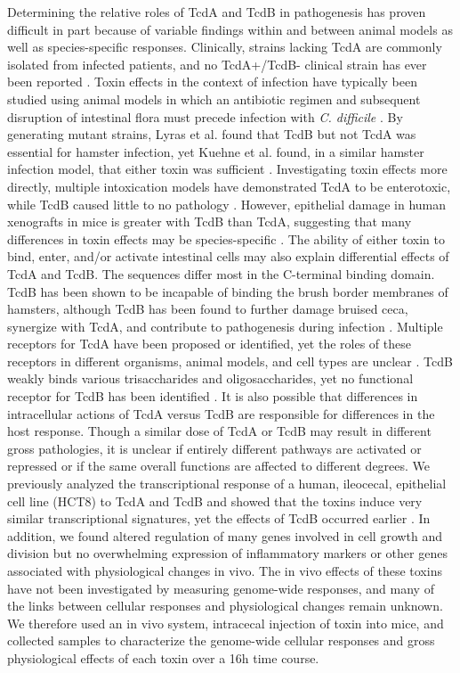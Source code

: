 Determining the relative roles of TcdA and TcdB in pathogenesis has proven difficult in part because of variable findings within and between animal models as well as species-specific responses. Clinically, strains lacking TcdA are commonly isolated from infected patients, and no TcdA+/TcdB- clinical strain has ever been reported \cite{Drudy:2007fa}. Toxin effects in the context of infection have typically been studied using animal models in which an antibiotic regimen and subsequent disruption of intestinal flora must precede infection with \textit{C. difficile} \cite{Small:1968ux,Bartlett:1977wr}. By generating mutant strains, Lyras et al. found that TcdB but not TcdA was essential for hamster infection, yet Kuehne et al. found, in a similar hamster infection model, that either toxin was sufficient \cite{Lyras:2009jx,Kuehne:2010hv}. Investigating toxin effects more directly, multiple intoxication models have demonstrated TcdA to be enterotoxic, while TcdB caused little to no pathology \cite{Libby:1982wm,Taylor:1981ud,Lyerly:1985dx}. However, epithelial damage in human xenografts in mice is greater with TcdB than TcdA, suggesting that many differences in toxin effects may be species-specific \cite{Savidge:2003ck}. The ability of either toxin to bind, enter, and/or activate intestinal cells may also explain differential effects of TcdA and TcdB. The sequences differ most in the C-terminal binding domain. TcdB has been shown to be incapable of binding the brush border membranes of hamsters, although TcdB has been found to further damage bruised ceca, synergize with TcdA, and contribute to pathogenesis during infection \cite{Lyras:2009jx,Lyerly:1985dx,Rolfe:1991vx}. Multiple receptors for TcdA have been proposed or identified, yet the roles of these receptors in different organisms, animal models, and cell types are unclear \cite{Krivan:1986tq,Tucker:1991uk,Rolfe:1995wl,Pothoulakis:1996ba,Pothoulakis:1996kd,Na:2008eu}. TcdB weakly binds various trisaccharides and oligosaccharides, yet no functional receptor for TcdB has been identified \cite{ElHawiet:2011ep}. It is also possible that differences in intracellular actions of TcdA versus TcdB are responsible for differences in the host response. Though a similar dose of TcdA or TcdB may result in different gross pathologies, it is unclear if entirely different pathways are activated or repressed or if the same overall functions are affected to different degrees. We previously analyzed the transcriptional response of a human, ileocecal, epithelial cell line (HCT8) to TcdA and TcdB and showed that the toxins induce very similar transcriptional signatures, yet the effects of TcdB occurred earlier \cite{DAuria:2012bd}. In addition, we found altered regulation of many genes involved in cell growth and division but no overwhelming expression of inflammatory markers or other genes associated with physiological changes in vivo. The in vivo effects of these toxins have not been investigated by measuring genome-wide responses, and many of the links between cellular responses and physiological changes remain unknown. We therefore used an in vivo system, intracecal injection of toxin into mice, and collected samples to characterize the genome-wide cellular responses and gross physiological effects of each toxin over a 16h time course.

